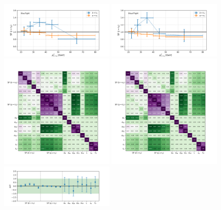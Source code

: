 \begin{figure}[h]
    \centering
    \includegraphics[width=0.49\textwidth]{chapters/Analysis/sectionCalibration/figures/jetToTauh/fit2_ptflavor2_lltauTight.png}
    \includegraphics[width=0.49\textwidth]{chapters/Analysis/sectionCalibration/figures/jetToTauh/fit2_ptflavor2_lltauVTight.png}
    \includegraphics[width=0.49\textwidth]{chapters/Analysis/sectionCalibration/figures/jetToTauh/corr2_lltauTight_splitJetFlavor.png}
    \includegraphics[width=0.49\textwidth]{chapters/Analysis/sectionCalibration/figures/jetToTauh/corr2_lltauVTight_splitJetFlavor.png}
    \includegraphics[width=0.49\textwidth]{chapters/Analysis/sectionCalibration/figures/jetToTauh/pull2_lltauTight_splitJetFlavor.png}

\end{figure}
